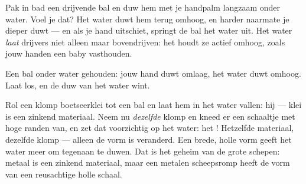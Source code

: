 \begin{example}\label{ex:g1:floating-and-sinking:push}
Pak in bad een drijvende bal en duw hem met je handpalm langzaam onder
water. Voel je dat? Het water duwt hem terug omhoog, en harder
naarmate je dieper duwt --- en als je hand uitschiet, springt de bal
het water uit. Het water \emph{laat} drijvers niet alleen maar
bovendrijven: het houdt ze actief omhoog, zoals jouw handen een baby
vasthouden.
\end{example}

\begin{omfigure}

{\small Een bal onder water gehouden: jouw hand duwt omlaag, het water
duwt omhoog. Laat los, en de duw van het water wint.}
\end{omfigure}

\begin{example}\label{ex:g1:floating-and-sinking:boat}
Rol een klomp boetseerklei tot een bal en laat hem in het water
vallen: hij  --- klei is een zinkend materiaal. Neem nu
\emph{dezelfde} klomp en kneed er een schaaltje met hoge randen van,
en zet dat voorzichtig op het water: het ! Hetzelfde
materiaal, dezelfde klomp --- alleen de vorm is veranderd. Een brede,
holle vorm geeft het water meer om tegenaan te duwen. Dat is het
geheim van de grote schepen: metaal is een zinkend materiaal, maar een
metalen scheepsromp heeft de vorm van een reusachtige holle schaal.
\end{example}

